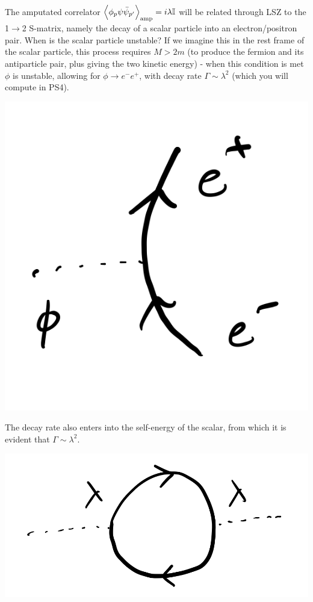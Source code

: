 The amputated correlator $\left< \phi_p\psi\bar{\psi}_{p'} \right>_{\text{amp}} = i\lambda\mathbb{I}$ will be related through LSZ to the 1$\to$2 S-matrix, namely the decay of a scalar particle into an electron/positron pair. When is the scalar particle unstable? If we imagine this in the rest frame of the scalar particle, this process requires $M > 2m$ (to produce the fermion and its antiparticle pair, plus giving the two kinetic energy) - when this condition is met $\phi$ is unstable, allowing for $\phi \to e^-e^+$, with decay rate $\Gamma \sim \lambda^2$ (which you will compute in PS4). 

\begin{center}
    \includegraphics[scale=0.35]{Lectures/Images/lec6-scattering.png}
\end{center}

The decay rate also enters into the self-energy of the scalar, from which it is evident that $\Gamma \sim \lambda^2$.

\begin{center}
    \includegraphics[scale=0.35]{Lectures/Images/lec6-selfenergy.png}
\end{center}

